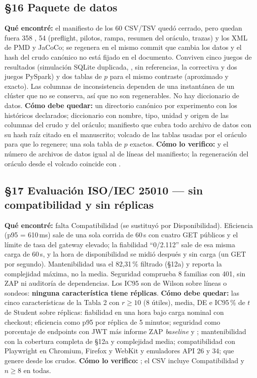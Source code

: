 \subsection*{\S16 Paquete de datos}
\textbf{Qu\'e encontr\'e:} el manifiesto de los 60 CSV/TSV qued\'o cerrado, pero quedan fuera 358 , 54  (preflight, pilotos, rampa, resumen del or\'aculo, trazas) y los XML de PMD y JaCoCo; se regenera en el mismo commit que cambia los datos y el hash del crudo can\'onico no est\'a fijado en el documento. Conviven cinco juegos de resultados (simulaci\'on SQLite duplicada, ,  sin referencias, la correctiva y dos juegos PySpark) y dos tablas de $p$ para el mismo contraste (aproximado y exacto). Las columnas de inconsistencia dependen de una instant\'anea de un cl\'uster que no se conserva, as\'i que no son regenerables. No hay diccionario de datos. \textbf{C\'omo debe quedar:} un directorio can\'onico por experimento con los hist\'oricos declarados; diccionario con nombre, tipo, unidad y origen de las columnas del crudo y del or\'aculo; manifiesto que cubra todo archivo de datos con su hash ra\'iz citado en el manuscrito; volcado de las tablas usadas por el or\'aculo para que  lo regenere; una sola tabla de $p$ exactos. \textbf{C\'omo lo verifico:}  y el n\'umero de archivos de datos igual al de l\'ineas del manifiesto; la regeneraci\'on del or\'aculo desde el volcado coincide con .

\subsection*{\S17 Evaluaci\'on ISO/IEC 25010 --- sin compatibilidad y sin r\'eplicas}
\textbf{Qu\'e encontr\'e:} falta Compatibilidad (se sustituy\'o por Disponibilidad). Eficiencia (p95 = 610\,ms) sale de una sola corrida de 60\,s con cuatro GET p\'ublicos y el l\'imite de tasa del gateway elevado; la fiabilidad ``0/2.112'' sale de esa misma carga de 60\,s, y la hora de disponibilidad se midi\'o despu\'es y sin carga (un GET por segundo). Mantenibilidad usa el 82,31\,\% filtrado (\S12a) y reporta la complejidad m\'axima, no la media. Seguridad comprueba 8 familias con 401, sin ZAP ni auditor\'ia de dependencias. Los IC95 son de Wilson sobre l\'ineas o sondeos: \textbf{ninguna caracter\'istica tiene r\'eplicas}. \textbf{C\'omo debe quedar:} las cinco caracter\'isticas de la Tabla 2 con $r \ge 10$ (8 \'utiles), media, DE e IC95\,\% de $t$ de Student sobre r\'eplicas: fiabilidad en una hora bajo carga nominal con checkout; eficiencia como p95 por r\'eplica de 5 minutos; seguridad como porcentaje de endpoints con JWT m\'as informe ZAP \emph{baseline} y ; mantenibilidad con la cobertura completa de \S12a y complejidad media; compatibilidad con Playwright en Chromium, Firefox y WebKit y emuladores API 26 y 34;  que genere  desde los crudos. \textbf{C\'omo lo verifico:} ; el CSV incluye Compatibilidad y $n \ge 8$ en todas.

